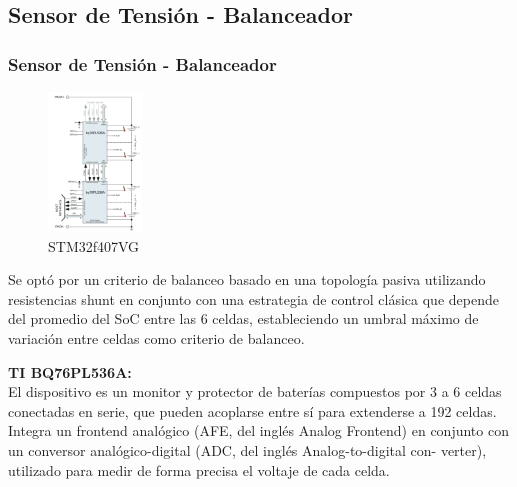 \documentclass[10pt]{beamer}
\theoremstyle{remark}
\theoremstyle{definition}
\begin{document}
\subsection{Sensor de Tensión - Balanceador}
\begin{frame}
    \frametitle{Sensor de Tensión - Balanceador}

    \begin{figure}
        \includegraphics[width=2.5cm]{images/bq76_simplified_schematic.png}
        \caption{STM32f407VG}
        \label{fig:stm32f407vg}                                                            
    \end{figure}                                                                 

    Se opt\'o por un criterio de balanceo basado en una topolog\'ia pasiva
    utilizando resistencias shunt en conjunto con una estrategia de control
    cl\'asica que depende del promedio del SoC entre las 6 celdas, estableciendo
    un umbral m\'aximo de variación entre celdas como criterio de balanceo.

    \textbf{TI BQ76PL536A:}\\
    El dispositivo es un monitor y protector de bater\'ias compuestos por 3 a 6
    celdas conectadas en serie, que pueden acoplarse entre s\'i para extenderse
    a 192 celdas. Integra un frontend anal\'ogico (AFE, del ingl\'es
    Analog Frontend) en conjunto con un conversor analógico-digital (ADC, del
    ingl\'es Analog-to-digital con- verter), utilizado para medir de forma precisa
    el voltaje de cada celda.

\end{frame}
\end{document}
